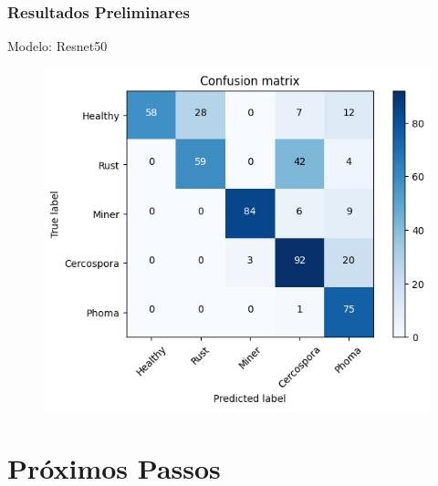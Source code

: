 \documentclass[aspectratio=169]{beamer}
\begin{document}
\begin{frame}
    \frametitle{Resultados Preliminares}



    \centering
    \tiny Modelo: Resnet50
    \begin{figure}
        \centering
        \includegraphics[scale=0.45]{img/resnet50result1.png}
        \label{fig:enter-label}
    \end{figure}



\end{frame}




\section{Próximos Passos}
\end{document}
